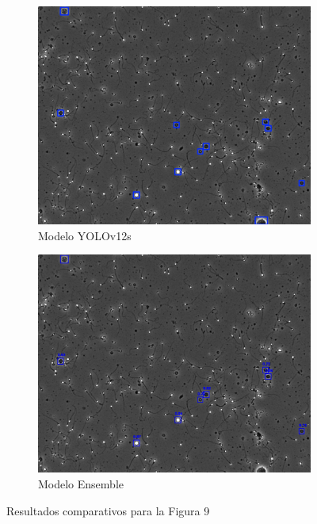 \documentclass[12pt,a4paper,onecolumn,oneside]{report}
\begin{document}
\begin{figure}[H]
  \vspace{0.3cm} 
  
  \begin{subfigure}[b]{0.48\textwidth}
    \centering
    \includegraphics[width=\textwidth]{figuras/evaluacion_cualitativa/9/9_v12.jpg}
    \caption{Modelo YOLOv12s}
    \label{fig:yolov12s_image_9}
  \end{subfigure}
  \hfill
  \begin{subfigure}[b]{0.48\textwidth}
    \centering
    \includegraphics[width=\textwidth]{figuras/evaluacion_cualitativa/9/9_ensemble.jpg}
    \caption{Modelo Ensemble}
    \label{fig:ensemble_image_9}
  \end{subfigure}
  
  \caption{Resultados comparativos para la Figura 9}
  \label{fig:9}
\end{figure}
\end{document}
